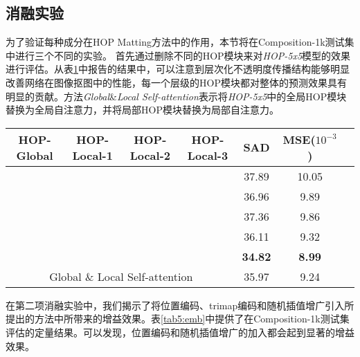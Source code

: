 \subsection{消融实验}
为了验证每种成分在HOP Matting方法中的作用，本节将在Composition-1k测试集中进行三个不同的实验。
首先通过删除不同的HOP模块来对\textit{HOP-5x5}模型的效果进行评估。从表\ref{tab5:block}中报告的结果中，可以注意到层次化不透明度传播结构能够明显改善网络在图像抠图中的性能，每一个层级的HOP模块都对整体的预测效果具有明显的贡献。方法\textit{Global}\&\textit{Local Self-attention}表示将\textit{HOP-5x5}中的全局HOP模块替换为全局自注意力，并将局部HOP模块替换为局部自注意力。


\begin{table}[t]
	\setlength{\tabcolsep}{8pt}
	\centering
	\begin{tabular}{cccc|ccc}  
		\toprule
		HOP-Global &HOP-Local-1 &HOP-Local-2 &HOP-Local-3& SAD& MSE($10^{-3}$) \\%
		\midrule
		&&& & 37.89  & 10.05   \\%
		\checkmark&&& & 36.96 & 9.89  \\%
		\checkmark&\checkmark&&& 37.36  & 9.86 \\%
		\checkmark&\checkmark&\checkmark& & 36.11 & 9.32 \\%
		\checkmark&\checkmark&\checkmark&\checkmark& \textbf{34.82} & \textbf{8.99}\\%
		\midrule
		\multicolumn{4}{c|}{Global \& Local Self-attention}&  35.97 & 9.24 \\%
		\bottomrule
	\end{tabular}
	\label{tab5:block}
\end{table}

在第二项消融实验中，我们揭示了将位置编码、trimap编码和随机插值增广引入所提出的方法中所带来的增益效果。表\ref{tab5:emb}中提供了在Composition-1k测试集\cite{xu2017deep}评估的定量结果。可以发现，位置编码和随机插值增广的加入都会起到显著的增益效果。

